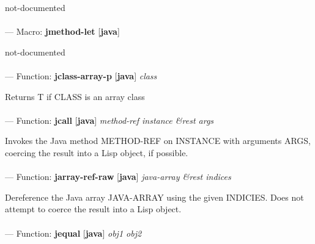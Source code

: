 \begin{adjustwidth}{5em}{5em}
not-documented
\end{adjustwidth}

\paragraph{}
\label{JAVA:JMETHOD-LET}
--- Macro: \textbf{jmethod-let} [\textbf{java}] \textit{}

\begin{adjustwidth}{5em}{5em}
not-documented
\end{adjustwidth}

\paragraph{}
\label{JAVA:JCLASS-ARRAY-P}
--- Function: \textbf{jclass-array-p} [\textbf{java}] \textit{class}

\begin{adjustwidth}{5em}{5em}
Returns T if CLASS is an array class
\end{adjustwidth}

\paragraph{}
\label{JAVA:JCALL}
--- Function: \textbf{jcall} [\textbf{java}] \textit{method-ref instance \&rest args}

\begin{adjustwidth}{5em}{5em}
Invokes the Java method METHOD-REF on INSTANCE with arguments ARGS, coercing the result into a Lisp object, if possible.
\end{adjustwidth}

\paragraph{}
\label{JAVA:JARRAY-REF-RAW}
--- Function: \textbf{jarray-ref-raw} [\textbf{java}] \textit{java-array \&rest indices}

\begin{adjustwidth}{5em}{5em}
Dereference the Java array JAVA-ARRAY using the given INDICIES. Does not attempt to coerce the result into a Lisp object.
\end{adjustwidth}

\paragraph{}
\label{JAVA:JEQUAL}
--- Function: \textbf{jequal} [\textbf{java}] \textit{obj1 obj2}

